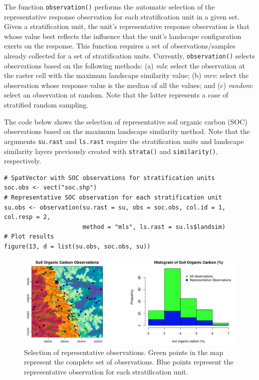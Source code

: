The function \texttt{observation()} performs the automatic selection of the
representative response observation for each stratification unit in a given set.
Given a stratification unit, the unit's representative response observation is
that whose value best reflects the influence that the unit's landscape
configuration exerts on the response. This function requires a set of
observations/samples already collected for a set of stratification units.
Currently, \texttt{observation()} selects observations based on the following methods:
(a) \emph{mls}: select the observation at the raster cell with the maximum landscape
similarity value; (b) \emph{mrv}: select the observation whose response value is the
median of all the values; and (c) \emph{random}: select an observation at random.
Note that the latter represents a case of stratified random sampling.

The code below shows the selection of representative soil organic carbon (SOC)
observations based on the maximum landscape similarity method. Note that the
arguments \texttt{su.rast} and \texttt{ls.rast} require the stratification units and landscape
similarity layers previously created with \texttt{strata()} and \texttt{similarity()},
respectively.

\begin{verbatim}
# SpatVector with SOC observations for stratification units
soc.obs <- vect("soc.shp")
# Representative SOC observation for each stratification unit
su.obs <- observation(su.rast = su, obs = soc.obs, col.id = 1, col.resp = 2,
                      method = "mls", ls.rast = su.ls$landsim)
# Plot results
figure(13, d = list(su.obs, soc.obs, su))
\end{verbatim}

\begin{figure}[H]

{\centering \includegraphics[width=1\linewidth,height=0.21\textheight]{figures/figure_13} 

}

\caption{Selection of representative observations. Green points in the map represent the complete set of observations. Blue points represent the representative observation for each stratification unit.}\label{fig:f14}
\end{figure}

